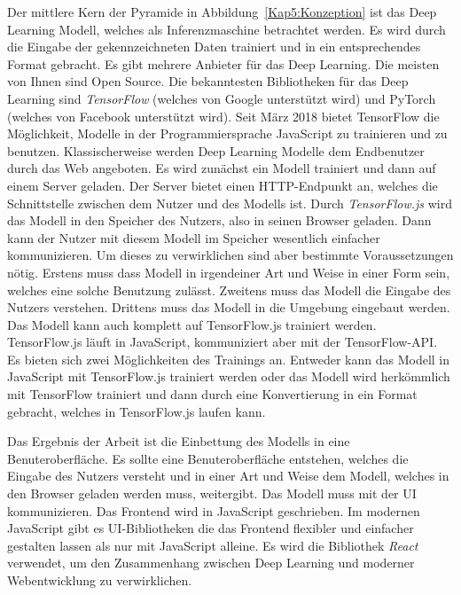 Der mittlere Kern der Pyramide in Abbildung~\ref{Kap5:Konzeption} ist das Deep Learning Modell, welches als Inferenzmaschine betrachtet werden. Es wird durch die Eingabe der gekennzeichneten Daten trainiert und in ein entsprechendes Format gebracht. Es gibt mehrere Anbieter für das Deep Learning. Die meisten von Ihnen sind Open Source. Die bekanntesten Bibliotheken für das Deep Learning sind \textit{TensorFlow} (welches von Google unterstützt wird) und PyTorch (welches von Facebook unterstützt wird). Seit März 2018 bietet TensorFlow die Möglichkeit, Modelle in der Programmiersprache JavaScript zu trainieren und zu benutzen. Klassischerweise werden Deep Learning Modelle dem Endbenutzer durch das Web angeboten. Es wird zunächst ein Modell trainiert und dann auf einem Server geladen. Der Server bietet einen HTTP-Endpunkt an, welches die Schnittstelle zwischen dem Nutzer und des Modells ist. Durch \textit{TensorFlow.js} wird das Modell in den Speicher des Nutzers, also in seinen Browser geladen. Dann kann der Nutzer mit diesem Modell im Speicher wesentlich einfacher kommunizieren. Um dieses zu verwirklichen sind aber bestimmte Voraussetzungen nötig. Erstens muss dass Modell in irgendeiner Art und Weise in einer Form sein, welches eine solche Benutzung zulässt. Zweitens muss das Modell die Eingabe des Nutzers verstehen. Drittens muss das Modell in die Umgebung eingebaut werden. Das Modell kann auch komplett auf TensorFlow.js trainiert werden. TensorFlow.js läuft in JavaScript, kommuniziert aber mit der TensorFlow-API. Es bieten sich zwei Möglichkeiten des Trainings an. Entweder kann das Modell in JavaScript mit TensorFlow.js trainiert werden oder das Modell wird herkömmlich mit TensorFlow trainiert und dann durch eine Konvertierung in ein Format gebracht, welches in TensorFlow.js laufen kann. 

Das Ergebnis der Arbeit ist die Einbettung des Modells in eine Benuteroberfläche. Es sollte eine Benuteroberfläche entstehen, welches die Eingabe des Nutzers versteht und in einer Art und Weise dem Modell, welches in den Browser geladen werden muss, weitergibt. Das Modell muss mit der UI kommunizieren. Das Frontend wird in JavaScript geschrieben. Im modernen JavaScript gibt es UI-Bibliotheken die das Frontend flexibler und einfacher gestalten lassen als nur mit JavaScript alleine. Es wird die Bibliothek \textit{React} verwendet, um den Zusammenhang zwischen Deep Learning und moderner Webentwicklung zu verwirklichen.

